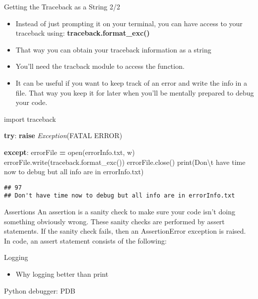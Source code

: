 \documentclass[
  8pt,
  ignorenonframetext,
]{beamer}
\newenvironment{Shaded}{\begin{snugshade}}{\end{snugshade}}
\newcommand{\BuiltInTok}[1]{#1}
\newcommand{\CharTok}[1]{\textcolor[rgb]{0.31,0.60,0.02}{#1}}
\newcommand{\ControlFlowTok}[1]{\textcolor[rgb]{0.13,0.29,0.53}{\textbf{#1}}}
\newcommand{\ImportTok}[1]{#1}
\newcommand{\NormalTok}[1]{#1}
\newcommand{\OperatorTok}[1]{\textcolor[rgb]{0.81,0.36,0.00}{\textbf{#1}}}
\newcommand{\PreprocessorTok}[1]{\textcolor[rgb]{0.56,0.35,0.01}{\textit{#1}}}
\newcommand{\StringTok}[1]{\textcolor[rgb]{0.31,0.60,0.02}{#1}}
\providecommand{\tightlist}{%
  \setlength{\itemsep}{0pt}\setlength{\parskip}{0pt}}
\begin{document}
\begin{frame}[fragile]{Getting the Traceback as a String 2/2}
\protect\hypertarget{getting-the-traceback-as-a-string-22}{}
\begin{itemize}
\item
  Instead of just prompting it on your terminal, you can have access to
  your traceback using: \textbf{traceback.format\_exc()}
\item
  That way you can obtain your traceback information as a string
\item
  You'll need the tracback module to access the function.
\item
  It can be useful if you want to keep track of an error and write the
  info in a file. That way you keep it for later when you'll be mentally
  prepared to debug your code.
\end{itemize}

\begin{Shaded}
\begin{Highlighting}[]
\ImportTok{import}\NormalTok{ traceback}

\ControlFlowTok{try}\NormalTok{:}
  \ControlFlowTok{raise} \PreprocessorTok{Exception}\NormalTok{(}\StringTok{\textquotesingle{}FATAL ERROR\textquotesingle{}}\NormalTok{)}

\ControlFlowTok{except}\NormalTok{:}
\NormalTok{  errorFile }\OperatorTok{=} \BuiltInTok{open}\NormalTok{(}\StringTok{\textquotesingle{}errorInfo.txt\textquotesingle{}}\NormalTok{, }\StringTok{\textquotesingle{}w\textquotesingle{}}\NormalTok{)}
\NormalTok{  errorFile.write(traceback.format\_exc())}
\NormalTok{  errorFile.close()}
  \BuiltInTok{print}\NormalTok{(}\StringTok{\textquotesingle{}Don}\CharTok{\textbackslash{}\textquotesingle{}}\StringTok{t have time now to debug but all info are in errorInfo.txt\textquotesingle{}}\NormalTok{)}
    
\end{Highlighting}
\end{Shaded}

\begin{verbatim}
## 97
## Don't have time now to debug but all info are in errorInfo.txt
\end{verbatim}
\end{frame}

\begin{frame}{Assertions}
\protect\hypertarget{assertions}{}
An assertion is a sanity check to make sure your code isn't doing
something obviously wrong. These sanity checks are performed by assert
statements. If the sanity check fails, then an AssertionError exception
is raised. In code, an assert statement consists of the following:
\end{frame}

\begin{frame}{Logging}
\protect\hypertarget{logging}{}
\begin{itemize}
\tightlist
\item
  Why logging better than print
\end{itemize}
\end{frame}

\begin{frame}{Python debugger: PDB}
\protect\hypertarget{python-debugger-pdb}{}
\end{frame}
\end{document}
